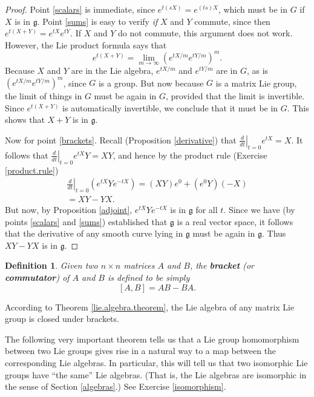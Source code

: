 \documentclass{amsbook}
\let \frak = \mathfrak
\theoremstyle{plain}
\newtheorem{definition}[theorem]{Definition}
\numberwithin{equation}{chapter}
\numberwithin{theorem}{chapter}
\begin{document}
\begin{proof}
Point \ref{scalars} is immediate, since $e^{t(sX)}=e^{(ts)X}$, which must be
in $G$ if $X$ is in $\frak{g}$. Point \ref{sums} is easy to verify \textit{if}
$X$ and $Y$ commute, since then $e^{t(X+Y)}=e^{tX}e^{tY}$. If $X$ and $Y$ do
not commute, this argument does not work. However, the Lie product formula
says that
\[
e^{t(X+Y)}=\lim_{m\rightarrow\infty}\left(  e^{tX/m}e^{tY/m}\right)
^{m}\text{.}%
\]
Because $X$ and $Y$ are in the Lie algebra, $e^{tX/m}$ and $e^{tY/m}$ are in
$G$, as is $\left(  e^{tX/m}e^{tY/m}\right)  ^{m}$, since $G$ is a group. But
now because $G$ is a matrix Lie group, the limit of things in $G$ must be
again in $G$, provided that the limit is invertible. Since $e^{t(X+Y)}$ is
automatically invertible, we conclude that it must be in $G$. This shows that
$X+Y$ is in $\frak{g}$.

Now for point \ref{brackets}. Recall (Proposition \ref{derivative}) that
$\left.  \frac{d}{dt}\right|  _{t=0}e^{tX}=X$. It follows that $\left.
\frac{d}{dt}\right|  _{t=0}e^{tX}Y=XY$, and hence by the product rule
(Exercise \ref{product.rule})
\begin{align*}
\left.  \frac{d}{dt}\right|  _{t=0}\left(  e^{tX}Ye^{-tX}\right)
=(XY)e^{0}+(e^{0}Y)(-X)\\
=XY-YX\text{.}%
\end{align*}
But now, by Proposition \ref{adjoint}, $e^{tX}Ye^{-tX}$ is in $\frak{g}$ for
all $t$. Since we have (by points \ref{scalars} and \ref{sums}) established
that $\frak{g}$ is a real vector space, it follows that the derivative of any
smooth curve lying in $\frak{g}$ must be again in $\frak{g}$. Thus $XY-YX$ is
in $\frak{g}$.
\end{proof}

\begin{definition}
Given two $n\times n$ matrices $A$ and $B$, the \textbf{bracket} (or
\textbf{commutator}) of $A$ and $B$ is defined to be simply
\[
\left[  A,B\right]  =AB-BA\text{.}%
\]
\end{definition}

According to Theorem \ref{lie.algebra.theorem}, the Lie algebra of any matrix
Lie group is closed under brackets.

The following very important theorem tells us that a Lie group homomorphism
between two Lie groups gives rise in a natural way to a map between the
corresponding Lie algebras. In particular, this will tell us that two
isomorphic Lie groups have ``the same'' Lie algebras. (That is, the Lie
algebras are isomorphic in the sense of Section \ref{algebras}.) See Exercise
\ref{isomorphism}.
\end{document}
